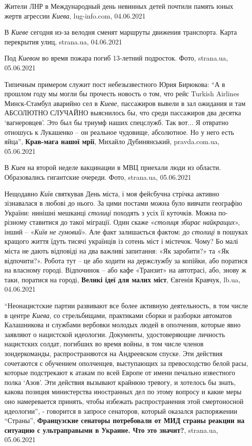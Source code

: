Жители ЛНР в Международный день невинных детей почтили память юных жертв агрессии \emph{Киева},
lug-info.com, 04.06.2021

В \emph{Киеве} сегодня из-за велодня сменят маршруты движения транспорта. Карта перекрытия улиц,
strana.ua, 04.06.2021

Под \emph{Киевом} во время пожара погиб 13-летний подросток. Фото,
strana.ua, 05.06.2021

Типичным примером служит пост небезызвестного Юрия Бирюкова: \enquote{А в прошлом году
мы могли бы прочесть новость о том, что рейс Turkish Airlines Минск-Стамбул
аварийно сел в \emph{Киеве}, пассажиров вывели в зал ожидания и там АБСОЛЮТНО СЛУЧАЙНО
выяснилось бы, что среди пассажиров два десятка \enquote{вагнеровцев}. Это был бы
триумф наших спецслужб. Так вот... Я отвратно отношусь к Лукашенко – он
реальное чудовище, абсолютное. Но у него есть яйца},
\textbf{Крав-мага нашої мрії},
Михайло Дубинянський, pravda.com.ua, 05.06.2021

В \emph{Киев} на второй неделе вакцинации в МВЦ приехали люди из области. Образовались гигантские очереди. Фото,
strana.ua, 05.06.2021

Нещодавно \emph{Київ} святкував День міста, і моя фейсбучна стрічка активно
зізнавалася в любові до нього. За цими постами можна було вивчати географію
України: нинішні мешканці \emph{столиці} походять з усіх її куточків. Можна по-різному
ставитися до такої міграції. Один скаже «\emph{столиця збирає найкращих}», інший –
«\emph{Київ не гумовий}». Але факт залишається фактом: до \emph{столиці} в пошуках кращого
життя їдуть тисячі українців із сотень міст і містечок.  Чому? Бо малі міста не
дають відповіді на два важливі запитання: «Як заробити?» та «Як відпочити?».
Робота тут – це або ходити на держслужбу за копійки, або поратися на власному
городі. Відпочинок – або кафе «Транзит» на автотрасі, або, знову ж таки,
поратися на городі,
\textbf{Великі ідеї для малих міст}, Євгенія Кравчук, lb.ua, 04.06.2021

\enquote{Неонацистские партии развивают все более активную деятельность, в том числе в
центре \emph{Киева}, со стрельбищами, практиками сборки и разборки автоматов
Калашникова и службами вербовки молодых людей в ополчения, которые явно
заявляют о нацистской идеологии. Документы, удостоверяющие личность нацистских
солдат, погибших во время войны, в том числе членов зондеркоманды,
распространяются на Андреевском спуске. Эти действия сочетаются с обучением
ополченцев, выступающих за превосходство белой расы, которые подстрекают к
атакам по всей Европе от имени печально известного полка \enquote{Азов}. Эти действия
вызывают крайнюю тревогу, и хотелось бы знать, какова позиция министерства
иностранных дел по этому вопросу и какие меры оно намеревается принять, чтобы
избежать распространения этой смертоносной идеологии}, - говорится в запросе
сенаторов, который оказался распоряжении \enquote{Страны},
\textbf{Французские сенаторы потребовали от МИД страны реакции на ситуацию с ультраправыми в Украине. Что это значит?},
strana.ua, 05.06.2021

